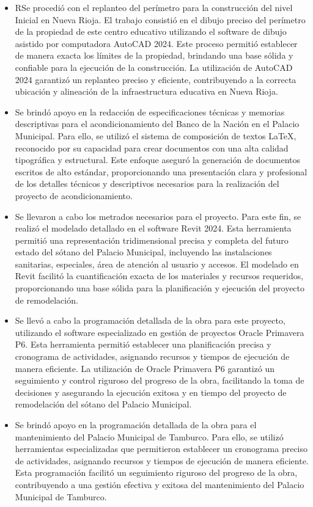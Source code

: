 \begin{itemize}
	\item RSe procedió con el replanteo del perímetro para la construcción del nivel Inicial en Nueva Rioja. El trabajo consistió en el dibujo preciso del perímetro de la propiedad de este centro educativo utilizando el software de dibujo asistido por computadora AutoCAD 2024. Este proceso permitió establecer de manera exacta los límites de la propiedad, brindando una base sólida y confiable para la ejecución de la construcción. La utilización de AutoCAD 2024 garantizó un replanteo preciso y eficiente, contribuyendo a la correcta ubicación y alineación de la infraestructura educativa en Nueva Rioja.
	\item Se brindó apoyo en la redacción de especificaciones técnicas y memorias descriptivas para el acondicionamiento del Banco de la Nación en el Palacio Municipal. Para ello, se utilizó el sistema de composición de textos \LaTeX, reconocido por su capacidad para crear documentos con una alta calidad tipográfica y estructural. Este enfoque aseguró la generación de documentos escritos de alto estándar, proporcionando una presentación clara y profesional de los detalles técnicos y descriptivos necesarios para la realización del proyecto de acondicionamiento.
	\item Se llevaron a cabo los metrados necesarios para el proyecto. Para este fin, se realizó el modelado detallado en el software Revit 2024. Esta herramienta permitió una representación tridimensional precisa y completa del futuro estado del sótano del Palacio Municipal, incluyendo las instalaciones sanitarias, especiales, área de atención al usuario y accesos. El modelado en Revit facilitó la cuantificación exacta de los materiales y recursos requeridos, proporcionando una base sólida para la planificación y ejecución del proyecto de remodelación.
	\item Se llevó a cabo la programación detallada de la obra para este proyecto, utilizando el software especializado en gestión de proyectos Oracle Primavera P6. Esta herramienta permitió establecer una planificación precisa y cronograma de actividades, asignando recursos y tiempos de ejecución de manera eficiente. La utilización de Oracle Primavera P6 garantizó un seguimiento y control riguroso del progreso de la obra, facilitando la toma de decisiones y asegurando la ejecución exitosa y en tiempo del proyecto de remodelación del sótano del Palacio Municipal.
	\item  Se brindó apoyo en la programación detallada de la obra para el mantenimiento del Palacio Municipal de Tamburco. Para ello, se utilizó herramientas especializadas que permitieron establecer un cronograma preciso de actividades, asignando recursos y tiempos de ejecución de manera eficiente. Esta programación facilitó un seguimiento riguroso del progreso de la obra, contribuyendo a una gestión efectiva y exitosa del mantenimiento del Palacio Municipal de Tamburco.
\end{itemize}


